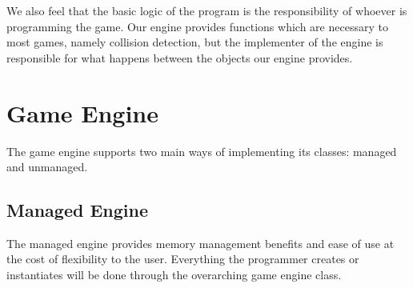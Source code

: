 \documentclass[12pt]{article}
\begin{document}
    We also feel that the basic logic of the program is the responsibility of whoever is programming the game. Our engine provides functions which are necessary to most games, namely collision detection, but the implementer of the engine is responsible for what happens between the objects our engine provides.

  \section{Game Engine}
    The game engine supports two main ways of implementing its classes: managed and unmanaged.
\subsection{Managed Engine}
The managed engine provides memory management benefits and ease of use at the cost of flexibility to the user. Everything the programmer creates or instantiates will be done through the overarching game engine class.
\end{document}
